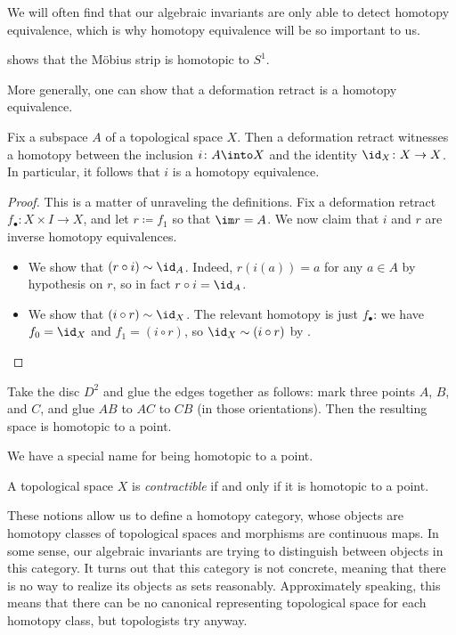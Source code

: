 \documentclass[../notes.tex]{subfiles}
\begin{document}
We will often find that our algebraic invariants are only able to detect homotopy equivalence, which is why homotopy equivalence will be so important to us.
\begin{example}
	 shows that the M\"obius strip is homotopic to $S^1$.
\end{example}
More generally, one can show that a deformation retract is a homotopy equivalence.
\begin{lemma}
	Fix a subspace $A$ of a topological space $X$. Then a deformation retract witnesses a homotopy between the inclusion $i\colon A\into X$ and the identity $\id_X\colon X\to X$. In particular, it follows that $i$ is a homotopy equivalence.
\end{lemma}
\begin{proof}
	This is a matter of unraveling the definitions. Fix a deformation retract $f_\bullet\colon X\times I\to X$, and let $r\coloneqq f_1$ so that $\im r=A$. We now claim that $i$ and $r$ are inverse homotopy equivalences.
	\begin{itemize}
		\item We show that $(r\circ i)\sim\id_A$. Indeed, $r(i(a))=a$ for any $a\in A$ by hypothesis on $r$, so in fact $r\circ i=\id_A$.
		\item We show that $(i\circ r)\sim\id_X$. The relevant homotopy is just $f_\bullet$: we have $f_0=\id_X$ and $f_1=(i\circ r)$, so ${\id_X}\sim(i\circ r)$ by .
		\qedhere
	\end{itemize}
\end{proof}
\begin{example}
	Take the disc $D^2$ and glue the edges together as follows: mark three points $A$, $B$, and $C$, and glue $AB$ to $AC$ to $CB$ (in those orientations). Then the resulting space is homotopic to a point.
\end{example}
We have a special name for being homotopic to a point.
\begin{definition}[contractible]
	A topological space $X$ is \textit{contractible} if and only if it is homotopic to a point.
\end{definition}
These notions allow us to define a homotopy category, whose objects are homotopy classes of topological spaces and morphisms are continuous maps. In some sense, our algebraic invariants are trying to distinguish between objects in this category. It turns out that this category is not concrete, meaning that there is no way to realize its objects as sets reasonably. Approximately speaking, this means that there can be no canonical representing topological space for each homotopy class, but topologists try anyway.
\end{document}
